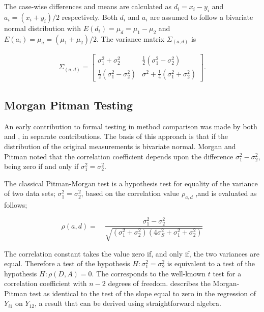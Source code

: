\documentclass[Main.tex]{subfiles}
\begin{document}

The case-wise differences and means are calculated as $d_{i} =
x_{i}-y_{i}$ and $a_{i} = (x_{i}+y_{i})/2$  respectively. Both
$d_{i}$ and $a_{i}$ are assumed to follow a bivariate normal
distribution with $E(d_{i})= \mu_{d} = \mu_{1} - \mu_{2}$ and
$E(a_{i})= \mu_{a} = (\mu_{1} + \mu_{2})/2$. The variance matrix
$\Sigma_{(a,d)}$ is

\begin{eqnarray}
\Sigma_{(a,d)}= \left[\begin{matrix}
\sigma^{2}_{1}+\sigma^{2}_{2}&\frac{1}{2}(\sigma^{2}_{1}-\sigma^{2}_{2})\\
\frac{1}{2}(\sigma^{2}_{1}-\sigma^{2}_{2})&\sigma^{2}+
\frac{1}{4}(\sigma^{2}_{1}+\sigma^{2}_{2})
\end{matrix} \right].
\end{eqnarray}



\subsection{Morgan Pitman Testing}
An early contribution to formal testing in method comparison was
made by both \citet{morgan} and \citet{pitman}, in separate
contributions. The basis of this approach is that if the
distribution of the original measurements is bivariate normal.
Morgan and Pitman noted that the correlation coefficient depends
upon the difference $\sigma^{2}_{1}- \sigma^{2}_{2}$, being zero
if and only if $\sigma^{2}_{1}=\sigma^{2}_{2}$.

The classical Pitman-Morgan test is a hypothesis test for equality
of the variance of two data sets; $\sigma^{2}_{1} =
\sigma^{2}_{2}$, based on the correlation value $\rho_{a,d}$ ,and
is evaluated as follows;

\begin{equation}
\rho(a,d)=\quad\frac{\sigma^{2}_{1}-\sigma^{2}_{2}}{\sqrt{(\sigma^{2}_{1}+\sigma^{2}_{2})(4\sigma^{2}_{S}+\sigma^{2}_{1}+\sigma^{2}_{2})}}
\end{equation}

The correlation constant takes the value zero if, and only if, the two variances are equal. Therefore a test of the hypothesis $H: \sigma^{2}_{1}=\sigma^{2}_{2}$ is equivalent to a test of the hypothesis $H: \rho(D,A) = 0$. The corresponds to the well-known
$t$ test for a correlation coefficient with $n-2$ degrees of freedom. \citet{Bartko} describes the Morgan-Pitman test as identical to
the test of the slope equal to zero in the regression of $Y_{i1}$ on $Y_{12}$, a result that can be derived using
straightforward algebra.
\end{document}
